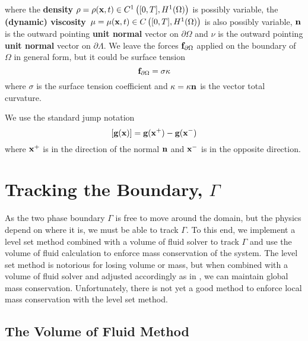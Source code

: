 \documentclass[letterpaper]{erdc}
\begin{document}
\noindent where the \textbf{density} $\rho = \rho(\textbf{x},t)\in C^{1}\left([0,T], H^{1}(\Omega)\right)$ is possibly variable, the \textbf{(dynamic) viscosity}\ $\mu = \mu(\textbf{x},t)\in C\left([0,T], H^{1}(\Omega)\right)$ is also possibly variable, $\textbf{n}$ is the outward pointing \textbf{unit normal} vector on $\partial\Omega$ and $\nu$ is the outward pointing \textbf{unit normal} vector on $\partial\Lambda$.  We leave the forces $\mathbf{f}_{\partial\Omega}$ applied on the boundary of $\Omega$ in general form, but it could be surface tension
\begin{equation}
	 \mathbf{f}_{\partial\Omega} = \sigma{\bf \kappa} 
\end{equation}
 where $\sigma$ is the surface tension coefficient and ${\bf \kappa} = \kappa\textbf{n}$ is the vector total curvature.

\noindent We use the standard jump notation
\begin{equation}  
	\left[ \textbf{g}(\textbf{x}) \right] = \textbf{g}(\textbf{x}^{+}) - \textbf{g}(\textbf{x}^{-})
\end{equation}
where $\textbf{x}^{+}$ is in the direction of the normal $\textbf{n}$ and $\textbf{x}^{-}$ is in the opposite direction.


\section{Tracking the Boundary, $\Gamma$}\label{sec:TrackingBoundaryGamma}
As the two phase boundary $\Gamma$ is free to move around the domain, but the physics depend on where it is, we must be able to track $\Gamma$.  To this end, we implement a level set method combined with a volume of fluid solver to track $\Gamma$ and use the volume of fluid calculation to enforce mass conservation of the system.  The level set method is notorious for losing volume or mass, but when combined with a volume of fluid solver and adjusted accordingly as in \cite{kees2011conservative}, we can maintain global mass conservation.  Unfortunately, there is not yet a good method to enforce local mass conservation with the level set method.

\subsection{The Volume of Fluid Method}\label{sec:VoFMEthod}
\end{document}
